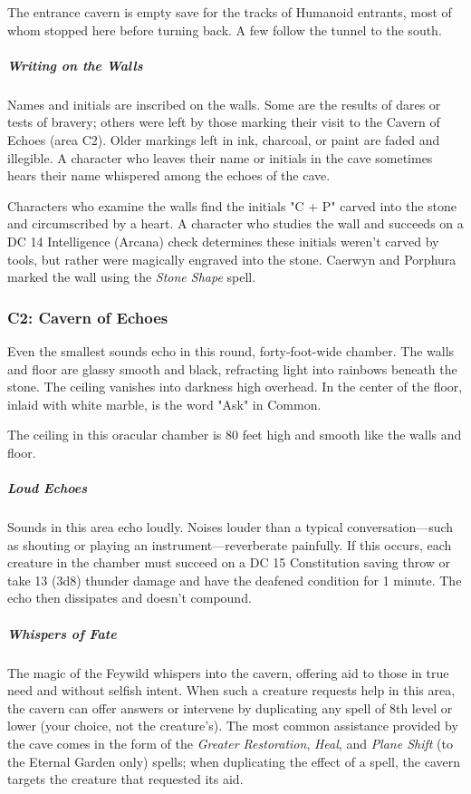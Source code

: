 \documentclass[10pt,a4paper,twoside,bg=print,twocolumn,openany,nodeprecatedcode]{dndbook}
\begin{document}
The entrance cavern is empty save for the tracks of Humanoid entrants, most of whom stopped here before turning back. A few follow the tunnel to the south.

\subparagraph{Writing on the Walls}
Names and initials are inscribed on the walls. Some are the results of dares or tests of bravery; others were left by those marking their visit to the Cavern of Echoes (area C2). Older markings left in ink, charcoal, or paint are faded and illegible. A character who leaves their name or initials in the cave sometimes hears their name whispered among the echoes of the cave.

Characters who examine the walls find the initials "C + P" carved into the stone and circumscribed by a heart. A character who studies the wall and succeeds on a DC 14 Intelligence (Arcana) check determines these initials weren't carved by tools, but rather were magically engraved into the stone. Caerwyn and Porphura marked the wall using the \textit{Stone Shape} spell.

\subsubsection{C2: Cavern of Echoes}
\begin{DndReadAloud}{}
Even the smallest sounds echo in this round, forty-foot-wide chamber. The walls and floor are glassy smooth and black, refracting light into rainbows beneath the stone. The ceiling vanishes into darkness high overhead. In the center of the floor, inlaid with white marble, is the word "Ask" in Common.

\end{DndReadAloud}

The ceiling in this oracular chamber is 80 feet high and smooth like the walls and floor.

\subparagraph{Loud Echoes}
Sounds in this area echo loudly. Noises louder than a typical conversation—such as shouting or playing an instrument—reverberate painfully. If this occurs, each creature in the chamber must succeed on a DC 15 Constitution saving throw or take 13 (3d8) thunder damage and have the deafened condition for 1 minute. The echo then dissipates and doesn't compound.

\subparagraph{Whispers of Fate}
The magic of the Feywild whispers into the cavern, offering aid to those in true need and without selfish intent. When such a creature requests help in this area, the cavern can offer answers or intervene by duplicating any spell of 8th level or lower (your choice, not the creature's). The most common assistance provided by the cave comes in the form of the \textit{Greater Restoration}, \textit{Heal}, and \textit{Plane Shift} (to the Eternal Garden only) spells; when duplicating the effect of a spell, the cavern targets the creature that requested its aid.
\end{document}

